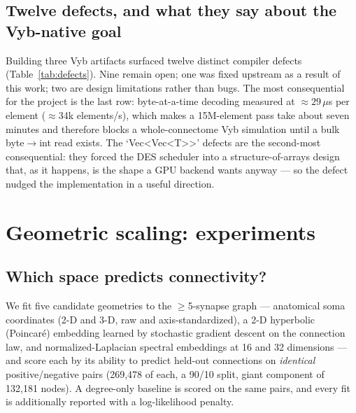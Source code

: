 \documentclass[11pt,a4paper]{article}
\begin{document}
\subsection{Twelve defects, and what they say about the Vyb-native goal}
Building three Vyb artifacts surfaced twelve distinct compiler defects (Table~\ref{tab:defects}).
Nine remain open; one was fixed upstream as a result of this work; two are design limitations
rather than bugs. The most consequential for the project is the last row: byte-at-a-time
decoding measured at $\approx29\,\mu$s per element ($\approx$34k elements/s), which makes a
15M-element pass take about seven minutes and therefore blocks a whole-connectome Vyb simulation
until a bulk byte$\to$int read exists. The `Vec<Vec<T>>' defects are the second-most
consequential: they forced the DES scheduler into a structure-of-arrays design that, as it
happens, is the shape a GPU backend wants anyway --- so the defect nudged the implementation in a
useful direction.

\label{tab:defects}


\FloatBarrier
\section{Geometric scaling: experiments}
\label{sec:scaling}

\subsection{Which space predicts connectivity?}
\label{sec:geometry}
We fit five candidate geometries to the $\geq$5-synapse graph --- anatomical soma coordinates
(2-D and 3-D, raw and axis-standardized), a 2-D hyperbolic (Poincaré) embedding learned by
stochastic gradient descent on the connection law, and normalized-Laplacian spectral embeddings
at 16 and 32 dimensions --- and score each by its ability to predict held-out connections on
\emph{identical} positive/negative pairs (269{,}478 of each, a 90/10 split, giant component of
132{,}181 nodes). A degree-only baseline is scored on the same pairs, and every fit is
additionally reported with a log-likelihood penalty.

\begin{table}[t]
\centering
\caption{Held-out connection prediction. Larger AUC is better. The degree-only baseline is not a
straw man: it is the strongest non-geometric predictor, and it beats every geometry except the
16- and 32-dimensional spectral embeddings.}
\label{tab:geometry}

\end{table}
\end{document}
